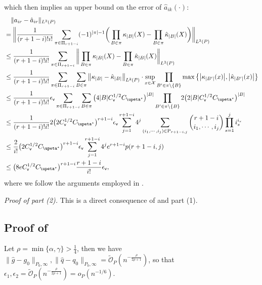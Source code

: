 \documentclass{article}
\def\eps{{\epsilon}}
\def\gO{{\mathcal{O}}}
\def\gX{{\mathcal{X}}}
\begin{document}
which then implies an upper bound on the error of $\hat{a}_{ik}(\cdot)$:
\begin{equation}
    \notag
    \begin{aligned}
        &\quad \|a_{ir}-\hat{a}_{ir}\|_{L^2(P)} \\
        &= \bigg\|\frac{1}{(r+1-i)!i!} \sum_{\pi\in\Pi_{r+1-i}} (-1)^{|\pi|-1} \bigg(\prod_{B\in\pi}\kappa_{|B|}(X)-\prod_{B\in\pi}\hat{\kappa}_{|B|}(X)\bigg)\bigg\|_{L^2(P)} \\
        &\leq  \frac{1}{(r+1-i)!i!} \sum_{\pi\in\Pi_{r+1-i}}\bigg\|\prod_{B\in\pi}\kappa_{|B|}(X)-\prod_{B\in\pi}\hat{\kappa}_{|B|}(X)\bigg\|_{L^2(P)} \\
        &\leq \frac{1}{(r+1-i)!i!} \sum_{\pi\in\Pi_{r+1-i}}\sum_{B\in\pi} \big\|\kappa_{|B|}-\hat{\kappa}_{|B|}\big\|_{L^2(P)}\cdot\sup_{x\in\gX}\prod_{B'\in\pi\setminus\{B\}} \max\big\{\big|\kappa_{|B'|}(x)\big|, \big|\hat{\kappa}_{|B'|}(x)\big|\big\} \\
        &\leq \frac{1}{(r+1-i)!i!}\eps_{\mathsf{v}} \sum_{\pi\in\Pi_{r+1-i}}\sum_{B\in\pi} \big(4|B|C_{\mathsf{v}}^{1/2}C_{\upeta^{\star}}\big)^{|B|}\prod_{B'\in\pi\setminus\{B\}} 2\big(2|B|C_{\mathsf{v}}^{1/2}C_{\upeta^{\star}}\big)^{|B|} \\
        &\leq \frac{1}{(r+1-i)!i!} 2\big(2C_{\mathsf{v}}^{1/2}C_{\upeta^{\star}}\big)^{r+1-i} \eps_{\mathsf{v}} \sum_{j=1}^{r+1-i} 4^j \sum_{(i_1,\cdots,i_j)\in\mathrm{P}_{r+1-i,j}} \binom{r+1-i}{i_1,\cdots,i_j}\prod_{s=1}^j i_s^{i_s} \\
        &\leq \frac{2}{i!} \big(2C_{\mathsf{v}}^{1/2}C_{\upeta^{\star}}\big)^{r+1-i} \eps_{\mathsf{v}} \sum_{j=1}^{r+1-i}4^j e^{r+1-i}p(r+1-i,j) \\
        &\leq \big(8eC_{\mathsf{v}}^{1/2}C_{\upeta^{\star}}\big)^{r+1-i}  \frac{r+1-i}{i!} \eps_{\mathsf{v}},
    \end{aligned}
\end{equation}
where we follow the arguments employed in .

\textit{Proof of part (2).} This is a direct consequence of  and part (1).


\subsection{Proof of }
\label{subsec:heteroscedastic-details}




Let $\rho = \min\{\alpha,\gamma\}>\frac{1}{4}$, then we have $\|\hat{g}-g_0\|_{P_0,\infty},\|\hat{q}-q_0\|_{P_0,\infty}=\tilde{\gO}_P(n^{-\frac{\rho}{2\rho+1}})$, so that $\eps_1,\eps_2=\tilde{\gO}_P(n^{-\frac{\rho}{2\rho+1}}) = o_P(n^{-1/6})$.
\end{document}
